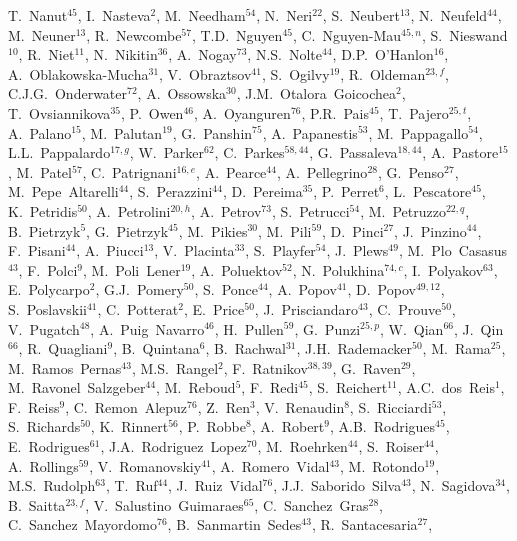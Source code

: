 \begin{flushleft}
T.~Nanut$^{45}$,
I.~Nasteva$^{2}$,
M.~Needham$^{54}$,
N.~Neri$^{22}$,
S.~Neubert$^{13}$,
N.~Neufeld$^{44}$,
M.~Neuner$^{13}$,
R.~Newcombe$^{57}$,
T.D.~Nguyen$^{45}$,
C.~Nguyen-Mau$^{45,n}$,
S.~Nieswand$^{10}$,
R.~Niet$^{11}$,
N.~Nikitin$^{36}$,
A.~Nogay$^{73}$,
N.S.~Nolte$^{44}$,
D.P.~O'Hanlon$^{16}$,
A.~Oblakowska-Mucha$^{31}$,
V.~Obraztsov$^{41}$,
S.~Ogilvy$^{19}$,
R.~Oldeman$^{23,f}$,
C.J.G.~Onderwater$^{72}$,
A.~Ossowska$^{30}$,
J.M.~Otalora~Goicochea$^{2}$,
T.~Ovsiannikova$^{35}$,
P.~Owen$^{46}$,
A.~Oyanguren$^{76}$,
P.R.~Pais$^{45}$,
T.~Pajero$^{25,t}$,
A.~Palano$^{15}$,
M.~Palutan$^{19}$,
G.~Panshin$^{75}$,
A.~Papanestis$^{53}$,
M.~Pappagallo$^{54}$,
L.L.~Pappalardo$^{17,g}$,
W.~Parker$^{62}$,
C.~Parkes$^{58,44}$,
G.~Passaleva$^{18,44}$,
A.~Pastore$^{15}$,
M.~Patel$^{57}$,
C.~Patrignani$^{16,e}$,
A.~Pearce$^{44}$,
A.~Pellegrino$^{28}$,
G.~Penso$^{27}$,
M.~Pepe~Altarelli$^{44}$,
S.~Perazzini$^{44}$,
D.~Pereima$^{35}$,
P.~Perret$^{6}$,
L.~Pescatore$^{45}$,
K.~Petridis$^{50}$,
A.~Petrolini$^{20,h}$,
A.~Petrov$^{73}$,
S.~Petrucci$^{54}$,
M.~Petruzzo$^{22,q}$,
B.~Pietrzyk$^{5}$,
G.~Pietrzyk$^{45}$,
M.~Pikies$^{30}$,
M.~Pili$^{59}$,
D.~Pinci$^{27}$,
J.~Pinzino$^{44}$,
F.~Pisani$^{44}$,
A.~Piucci$^{13}$,
V.~Placinta$^{33}$,
S.~Playfer$^{54}$,
J.~Plews$^{49}$,
M.~Plo~Casasus$^{43}$,
F.~Polci$^{9}$,
M.~Poli~Lener$^{19}$,
A.~Poluektov$^{52}$,
N.~Polukhina$^{74,c}$,
I.~Polyakov$^{63}$,
E.~Polycarpo$^{2}$,
G.J.~Pomery$^{50}$,
S.~Ponce$^{44}$,
A.~Popov$^{41}$,
D.~Popov$^{49,12}$,
S.~Poslavskii$^{41}$,
C.~Potterat$^{2}$,
E.~Price$^{50}$,
J.~Prisciandaro$^{43}$,
C.~Prouve$^{50}$,
V.~Pugatch$^{48}$,
A.~Puig~Navarro$^{46}$,
H.~Pullen$^{59}$,
G.~Punzi$^{25,p}$,
W.~Qian$^{66}$,
J.~Qin$^{66}$,
R.~Quagliani$^{9}$,
B.~Quintana$^{6}$,
B.~Rachwal$^{31}$,
J.H.~Rademacker$^{50}$,
M.~Rama$^{25}$,
M.~Ramos~Pernas$^{43}$,
M.S.~Rangel$^{2}$,
F.~Ratnikov$^{38,39}$,
G.~Raven$^{29}$,
M.~Ravonel~Salzgeber$^{44}$,
M.~Reboud$^{5}$,
F.~Redi$^{45}$,
S.~Reichert$^{11}$,
A.C.~dos~Reis$^{1}$,
F.~Reiss$^{9}$,
C.~Remon~Alepuz$^{76}$,
Z.~Ren$^{3}$,
V.~Renaudin$^{8}$,
S.~Ricciardi$^{53}$,
S.~Richards$^{50}$,
K.~Rinnert$^{56}$,
P.~Robbe$^{8}$,
A.~Robert$^{9}$,
A.B.~Rodrigues$^{45}$,
E.~Rodrigues$^{61}$,
J.A.~Rodriguez~Lopez$^{70}$,
M.~Roehrken$^{44}$,
S.~Roiser$^{44}$,
A.~Rollings$^{59}$,
V.~Romanovskiy$^{41}$,
A.~Romero~Vidal$^{43}$,
M.~Rotondo$^{19}$,
M.S.~Rudolph$^{63}$,
T.~Ruf$^{44}$,
J.~Ruiz~Vidal$^{76}$,
J.J.~Saborido~Silva$^{43}$,
N.~Sagidova$^{34}$,
B.~Saitta$^{23,f}$,
V.~Salustino~Guimaraes$^{65}$,
C.~Sanchez~Gras$^{28}$,
C.~Sanchez~Mayordomo$^{76}$,
B.~Sanmartin~Sedes$^{43}$,
R.~Santacesaria$^{27}$,

\end{flushleft}
